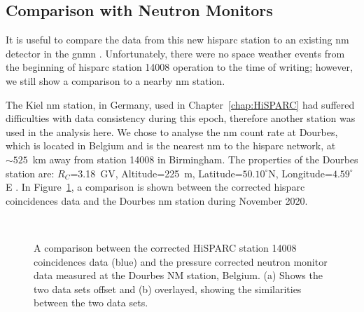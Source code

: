\subsection{Comparison with Neutron Monitors}\label{sec:HS_14008_vs_Kiel}

It is useful to compare the data from this new \gls{hisparc} station to an existing \gls{nm} detector in the \gls{gnmn} \citep{mishev_current_2020}. Unfortunately, there were no space weather events from the beginning of \gls{hisparc} station 14008 operation to the time of writing; however, we still show a comparison to a nearby \gls{nm} station. %

The Kiel \gls{nm} station, in Germany, used in Chapter~\ref{chap:HiSPARC} had suffered difficulties with data consistency during this epoch, therefore another station was used in the analysis here. We chose to analyse the \gls{nm} count rate at Dourbes, which is located in Belgium and is the nearest \gls{nm} to the \gls{hisparc} network, at $\sim 525$~km away from station 14008 in Birmingham. The properties of the Dourbes station are: $R_C$=3.18~GV, Altitude=225~m, Latitude=$50.10^{\circ}$N, Longitude=$4.59^{\circ}$E \citep{nmdb_nmdb_nodate}. In Figure~\ref{fig:14008_vs_DRBS}, a comparison is shown between the corrected \gls{hisparc} coincidences data and the Dourbes \gls{nm} station during November 2020.

\begin{figure}[ht!]
	\centering
	 \\

	
	\caption{A comparison between the corrected HiSPARC station 14008 coincidences data (blue) and the pressure corrected neutron monitor data measured at the Dourbes NM station, Belgium. (a) Shows the two data sets offset and (b) overlayed, showing the similarities between the two data sets.}
	\label{fig:14008_vs_DRBS}
\end{figure}


